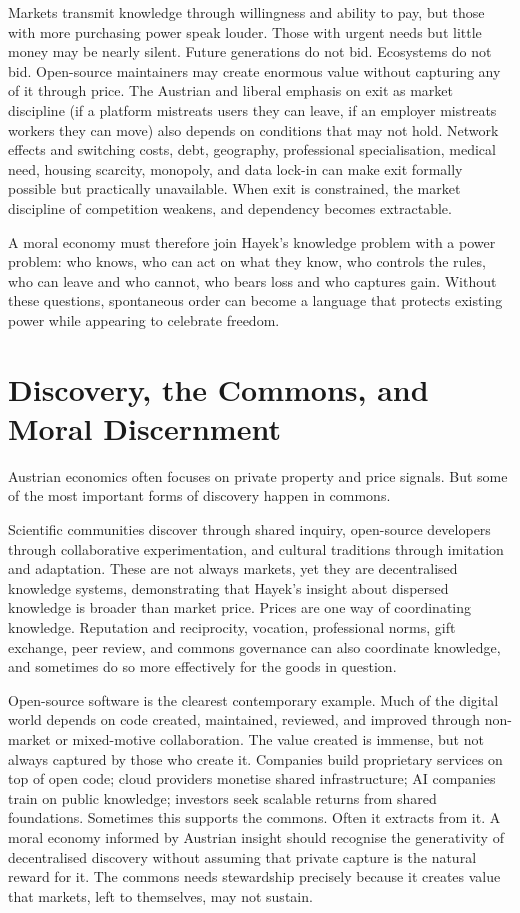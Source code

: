 \documentclass[11pt,a4paper,oneside]{book}
\begin{document}
Markets transmit knowledge through willingness and ability to pay, but those with more purchasing power speak louder. Those with urgent needs but little money may be nearly silent. Future generations do not bid. Ecosystems do not bid. Open-source maintainers may create enormous value without capturing any of it through price. The Austrian and liberal emphasis on exit as market discipline (if a platform mistreats users they can leave, if an employer mistreats workers they can move) also depends on conditions that may not hold. Network effects and switching costs, debt, geography, professional specialisation, medical need, housing scarcity, monopoly, and data lock-in can make exit formally possible but practically unavailable. When exit is constrained, the market discipline of competition weakens, and dependency becomes extractable.

A moral economy must therefore join Hayek's knowledge problem with a power problem: who knows, who can act on what they know, who controls the rules, who can leave and who cannot, who bears loss and who captures gain. Without these questions, spontaneous order can become a language that protects existing power while appearing to celebrate freedom.

\section*{Discovery, the Commons, and Moral Discernment}

Austrian economics often focuses on private property and price signals. But some of the most important forms of discovery happen in commons.

Scientific communities discover through shared inquiry, open-source developers through collaborative experimentation, and cultural traditions through imitation and adaptation. These are not always markets, yet they are decentralised knowledge systems, demonstrating that Hayek's insight about dispersed knowledge is broader than market price. Prices are one way of coordinating knowledge. Reputation and reciprocity, vocation, professional norms, gift exchange, peer review, and commons governance can also coordinate knowledge, and sometimes do so more effectively for the goods in question.

Open-source software is the clearest contemporary example. Much of the digital world depends on code created, maintained, reviewed, and improved through non-market or mixed-motive collaboration. The value created is immense, but not always captured by those who create it. Companies build proprietary services on top of open code; cloud providers monetise shared infrastructure; AI companies train on public knowledge; investors seek scalable returns from shared foundations. Sometimes this supports the commons. Often it extracts from it. A moral economy informed by Austrian insight should recognise the generativity of decentralised discovery without assuming that private capture is the natural reward for it. The commons needs stewardship precisely because it creates value that markets, left to themselves, may not sustain.
\end{document}
